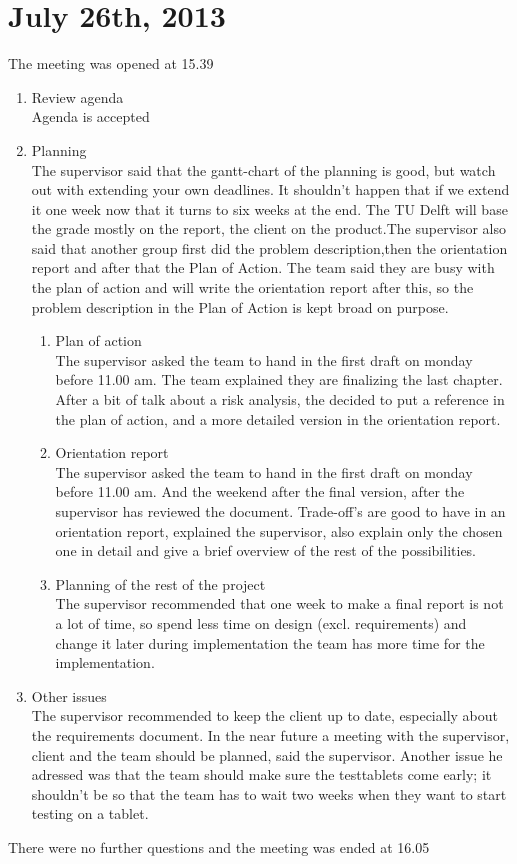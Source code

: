 \section{July 26th, 2013}
The meeting was opened at 15.39

\begin{enumerate}
\item Review agenda\\		
Agenda is accepted
	
\item Planning\\
The supervisor said that the gantt-chart of the planning is good, but watch out with extending your own deadlines. It shouldn't happen that if we extend it one week now that it turns to six weeks at the end. The TU Delft will base the grade mostly on the report, the client on the product.The supervisor also said that another group first did the problem description,then the orientation report and after that the Plan of Action. The team said they are busy with the plan of action and will write the orientation report after this, so the problem description in the Plan of Action is kept broad on purpose.

\begin{enumerate}
\item Plan of action\\
The supervisor asked the team to hand in the first draft on monday before 11.00 am. The team explained they are finalizing the last chapter. After a bit of talk about a risk analysis, the decided to put a reference in the plan of action, and a more detailed version in the orientation report.

\item Orientation report\\
The supervisor asked the team to hand in the first draft on monday before 11.00 am. And the weekend after the final version, after the supervisor has reviewed the document. Trade-off's are good to have in an orientation report, explained the supervisor, also explain only the chosen one in detail and give a brief overview of the rest of the possibilities. 

\item Planning of the rest of the project \\
The supervisor recommended that one week to make a final report is not a lot of time, so spend less time on design (excl. requirements) and change it later during implementation the team has more time for the implementation.

\end{enumerate}
\item Other issues\\
The supervisor recommended to keep the client up to date, especially about the requirements document.
In the near future a meeting with the supervisor, client and the team should be planned, said the supervisor. Another issue he adressed was that the team should make sure the testtablets come early; it shouldn't be so that the team has to wait two weeks when they want to start testing on a tablet.

\end{enumerate}

There were no further questions and the meeting was ended at 16.05
